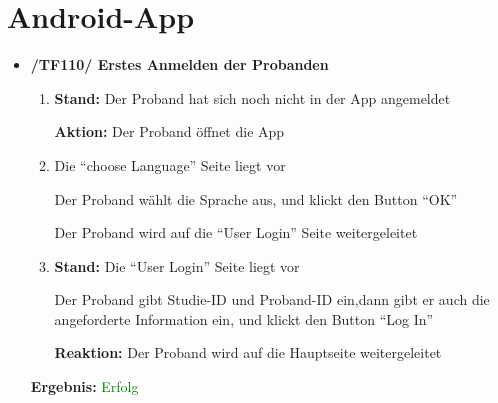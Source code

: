 \documentclass[a4paper]{scrreprt}
\begin{document}
	
	      \section{Android-App}
              \begin{itemize}
                  \item \textbf{/TF110/ Erstes Anmelden der Probanden}
                  \begin{enumerate}
                        \item \par \textbf{Stand: }Der Proband hat sich noch nicht in der App angemeldet
                        \par \textbf{Aktion: }Der Proband öffnet die App
                        \par {}

                        \par \textbf{{\color{blue}{Reaktion: }}} {\color{blue}{Die App wechselt auf die ``choose Language'' Seite}}
                        \item \par \textbf{{\color{blue}{Stand: }}}{\color{blue} Die ``choose Language'' Seite liegt vor}
                        \par \textbf{{\color{blue}{Aktion: }}}{\color{blue}Der Proband wählt die Sprache aus, und klickt den Button ``OK''}
                        \par \textbf{{\color{blue}{Reaktion: }}}{\color{blue}Der Proband wird auf die ``User Login'' Seite weitergeleitet}
                        \item \par \textbf{Stand: }Die ``User Login'' Seite liegt vor
                        \par {}
                        \par \textbf{{\color{blue}{Aktion: }}}{\color{blue}Der Proband gibt Studie-ID und Proband-ID ein,dann gibt er auch die angeforderte Information ein, und klickt den Button ``Log In''}
                        \par \textbf{Reaktion: }Der Proband wird auf die Hauptseite weitergeleitet
                  \end{enumerate}

                               \vspace*{0.3cm}
		      		           \par \textbf{Ergebnis: }\textcolor{green}{Erfolg}
		      		           \vspace*{0.6cm}


\end{itemize}
\end{document}
